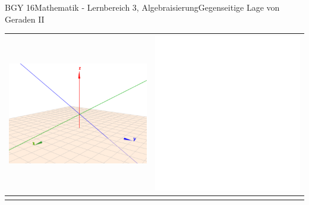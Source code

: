 \documentclass[oneside,openany,headings=optiontotoc,11pt,numbers=noenddot]{scrreprt}
\begin{document}
\begin{worksheet}{BGY 16}{Mathematik - Lernbereich 3, Algebraisierung}{Gegenseitige Lage von Geraden II}
\begin{framed}
\begin{center}
\begin{tabularx}{\textwidth}{Xr}
					\includegraphics[scale=0.42]{Bilder/ghSchnitt3D.png} & \includegraphics[scale=0.36]{../empty.jpg}\\
					\hline\\

\end{tabularx}
\end{center}
\end{framed}
\end{worksheet}
\end{document}
